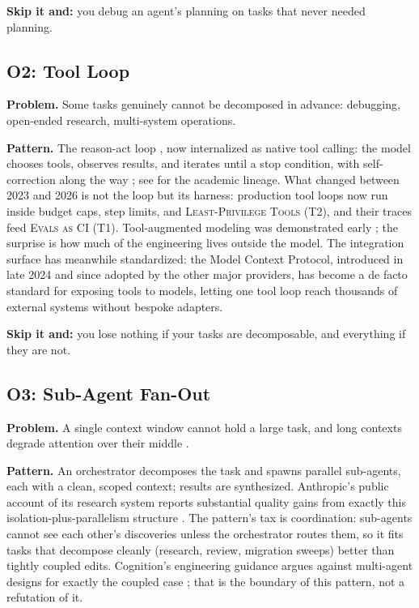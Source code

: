 \documentclass[11pt]{article}
\newcommand{\pat}[1]{\textsc{#1}}
\begin{document}
\textbf{Skip it and:} you debug an agent's planning on tasks that never needed
planning.

\subsection{O2: Tool Loop}

\textbf{Problem.} Some tasks genuinely cannot be decomposed in advance:
debugging, open-ended research, multi-system operations.

\textbf{Pattern.} The reason-act loop \citep{yao2023react}, now internalized
as native tool calling: the model chooses tools, observes results, and
iterates until a stop condition, with self-correction along the way
\citep{shinn2023reflexion, madaan2023selfrefine}; see
\citet{wang2024agentsurvey} for the academic lineage. What changed between 2023
and 2026 is not the loop but its harness: production tool loops now run
inside budget caps, step limits, and \pat{Least-Privilege Tools} (T2), and
their traces feed \pat{Evals as CI} (T1). Tool-augmented modeling was
demonstrated early \citep{schick2023toolformer}; the surprise is how much of
the engineering lives outside the model. The integration surface has
meanwhile standardized: the Model Context Protocol, introduced in late 2024
\citep{anthropic2024mcp} and since adopted by the other major providers, has
become a de facto standard for exposing tools to models, letting one tool
loop reach thousands of external systems without bespoke adapters.

\textbf{Skip it and:} you lose nothing if your tasks are decomposable, and
everything if they are not.

\subsection{O3: Sub-Agent Fan-Out}

\textbf{Problem.} A single context window cannot hold a large task, and long
contexts degrade attention over their middle \citep{liu2024lost}.

\textbf{Pattern.} An orchestrator decomposes the task and spawns parallel
sub-agents, each with a clean, scoped context; results are synthesized.
Anthropic's public account of its research system reports substantial quality
gains from exactly this isolation-plus-parallelism structure
\citep{anthropic2025multiagent}. The pattern's tax is coordination:
sub-agents cannot see each other's discoveries unless the orchestrator routes
them, so it fits tasks that decompose cleanly (research, review, migration
sweeps) better than tightly coupled edits. Cognition's engineering guidance
argues against multi-agent designs for exactly the coupled case
\citep{cognition2025dontbuild}; that is the boundary of this pattern, not a
refutation of it.
\end{document}
